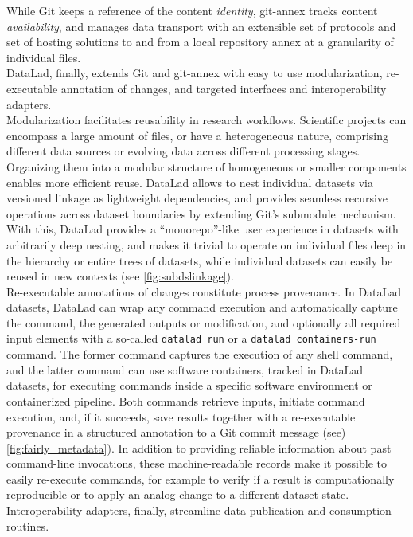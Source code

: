 {While Git keeps a reference of the content \textit{identity}, git-annex tracks content \textit{availability}, and manages data transport with an extensible set of protocols and set of hosting solutions to and from a local repository annex at a granularity of individual files. \\
DataLad, finally, extends Git and git-annex with easy to use modularization, re-executable annotation of changes, and targeted interfaces and interoperability adapters.\\
Modularization facilitates reusability in research workflows.
Scientific projects can encompass a large amount of files, or have a heterogeneous nature, comprising different data sources or evolving data across different processing stages.
Organizing them into a modular structure of homogeneous or smaller components enables more efficient reuse.
DataLad allows to nest individual datasets via versioned linkage as lightweight dependencies, and provides seamless recursive operations across dataset boundaries by extending Git’s submodule mechanism.
With this, DataLad provides a ``monorepo''-like user experience in datasets with arbitrarily deep nesting, and makes it trivial to operate on individual files deep in the hierarchy or entire trees of datasets, while individual datasets can easily be reused in new contexts (see \cref{fig:subdslinkage}).\\
Re-executable annotations of changes constitute process provenance.
In DataLad datasets, DataLad can wrap any command execution and automatically capture the command, the generated outputs or modification, and optionally all required input elements with a so-called \texttt{datalad run} or a \texttt{datalad containers-run} command.
The former command captures the execution of any shell command, and the latter command can use software containers, tracked in DataLad datasets, for executing commands inside a specific software environment or containerized pipeline.
Both commands retrieve inputs, initiate command execution, and, if it succeeds, save results together with a re-executable provenance in a structured annotation to a Git commit message (see)\cref{fig:fairly_metadata}).
In addition to providing reliable information about past command-line invocations, these machine-readable records make it possible to easily re-execute commands, for example to verify if a result is computationally reproducible or to apply an analog change to a different dataset state.\\
Interoperability adapters, finally, streamline data publication and consumption routines.
}
